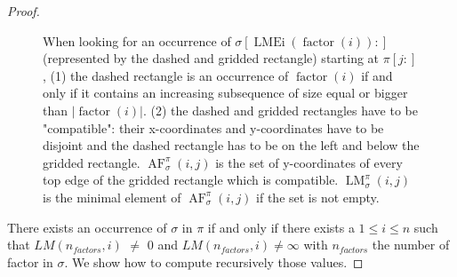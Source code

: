 \documentclass[a4paper]{llncs}
\newcommand{\ptext}{\pi}
\newcommand{\ppattern}{\sigma}
\newcounter{num}
\DeclareMathOperator{\LMEi}{LMEi}
\DeclareMathOperator{\factor}{factor}
\DeclareMathOperator{\LMa}{LM}
\newcommand{\LM}[4]{\LMa_{{#1}}^{{#2}}(#3,#4)}
\DeclareMathOperator{\AFa}{AF}
\newcommand{\AF}[4]{\AFa_{{#1}}^{{#2}}(#3,#4)}
\begin{document}
\begin{proof}
\begin{figure}[t]
	
	
	\caption{
		When looking for an occurrence of $\sigma[\LMEi(\factor(i)):]$ (represented by the dashed and gridded rectangle) starting at $\pi[j:]$, (1) the dashed rectangle is an occurrence of $\factor(i)$ if and only if
		it contains an increasing subsequence of size equal or bigger than $|\factor(i)|$.
		(2) the dashed and gridded rectangles have to be "compatible": their x-coordinates and y-coordinates have to be disjoint and the dashed rectangle has to be on the left and below the gridded rectangle.
		$\AF{\ppattern}{\ptext}{i}{j}$ is the set of y-coordinates of every top edge of the gridded rectangle which is compatible. $\LM{\ppattern}{\ptext}{i}{j}$ is the minimal element of $\AF{\ppattern}{\ptext}{i}{j}$ if the set is not empty.}	
	\label{fig: algo 1 fig}	
\end{figure}

There exists an occurrence of $\ppattern$ in $\ptext$ if and only if
there exists a $1 \leq i \leq n$ such that $LM(n_{factors},i)$ $\neq$ $0$ and $LM(n_{factors},i)\neq \infty$
with $n_{factors}$ the number of factor in $\ppattern$.
We show how to compute recursively those values.


\end{proof}
\end{document}

